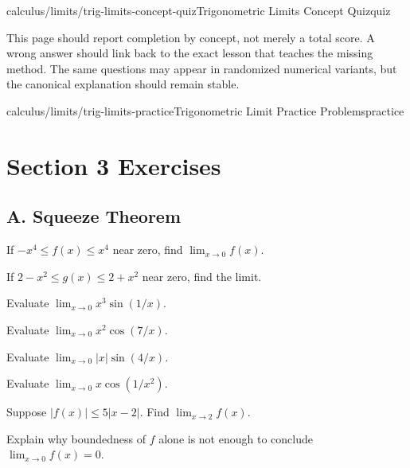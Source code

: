 \begin{webpage}{calculus/limits/trig-limits-concept-quiz}{Trigonometric Limits Concept Quiz}{quiz}
\begin{bgsummary}[title={Quiz use on the website}]
This page should report completion by concept, not merely a total score. A wrong answer should link back to the exact lesson that teaches the missing method. The same questions may appear in randomized numerical variants, but the canonical explanation should remain stable.
\end{bgsummary}
\end{webpage}

\begin{webpage}{calculus/limits/trig-limits-practice}{Trigonometric Limit Practice Problems}{practice}
\section*{Section 3 Exercises}

\subsection*{A. Squeeze Theorem}
\begin{bgexercises}[label=\textbf{3.\arabic*}]
  \item If \(-x^4\le f(x)\le x^4\) near zero, find \(\lim_{x\to0}f(x)\).
  \item If \(2-x^2\le g(x)\le2+x^2\) near zero, find the limit.
  \item Evaluate \(\lim_{x\to0}x^3\sin(1/x)\).
  \item Evaluate \(\lim_{x\to0}x^2\cos(7/x)\).
  \item Evaluate \(\lim_{x\to0}|x|\sin(4/x)\).
  \item Evaluate \(\lim_{x\to0}x\cos(1/x^2)\).
  \item Suppose \(|f(x)|\le5|x-2|\). Find \(\lim_{x\to2}f(x)\).
  \item Explain why boundedness of \(f\) alone is not enough to conclude \(\lim_{x\to0}f(x)=0\).
\end{bgexercises}


\end{webpage}
